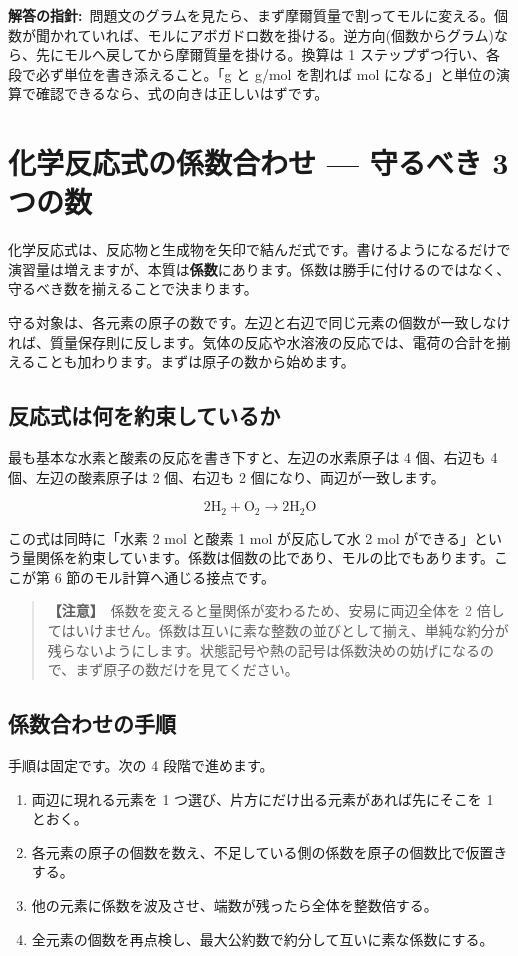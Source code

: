\documentclass{article}
\begin{document}
\textbf{解答の指針:}\ 問題文のグラムを見たら、まず摩爾質量で割ってモルに変える。個数が聞かれていれば、モルにアボガドロ数を掛ける。逆方向(個数からグラム)なら、先にモルへ戻してから摩爾質量を掛ける。換算は 1 ステップずつ行い、各段で必ず単位を書き添えること。「g と g/mol を割れば mol になる」と単位の演算で確認できるなら、式の向きは正しいはずです。

\section{化学反応式の係数合わせ — 守るべき 3 つの数}

化学反応式は、反応物と生成物を矢印で結んだ式です。書けるようになるだけで演習量は増えますが、本質は\textbf{係数}にあります。係数は勝手に付けるのではなく、守るべき数を揃えることで決まります。

守る対象は、各元素の原子の数です。左辺と右辺で同じ元素の個数が一致しなければ、質量保存則に反します。気体の反応や水溶液の反応では、電荷の合計を揃えることも加わります。まずは原子の数から始めます。

\subsection{反応式は何を約束しているか}

最も基本な水素と酸素の反応を書き下すと、左辺の水素原子は 4 個、右辺も 4 個、左辺の酸素原子は 2 個、右辺も 2 個になり、両辺が一致します。

\[ 2\mathrm{H}_{2} + \mathrm{O}_{2} \rightarrow 2\mathrm{H}_{2}\mathrm{O} \]

この式は同時に「水素 2 mol と酸素 1 mol が反応して水 2 mol ができる」という量関係を約束しています。係数は個数の比であり、モルの比でもあります。ここが第 6 節のモル計算へ通じる接点です。

\begin{quote}
\textbf{【注意】}\ 係数を変えると量関係が変わるため、安易に両辺全体を 2 倍してはいけません。係数は互いに素な整数の並びとして揃え、単純な約分が残らないようにします。状態記号や熱の記号は係数決めの妨げになるので、まず原子の数だけを見てください。
\end{quote}

\subsection{係数合わせの手順}

手順は固定です。次の 4 段階で進めます。

\begin{enumerate}
\item 両辺に現れる元素を 1 つ選び、片方にだけ出る元素があれば先にそこを 1 とおく。
\item 各元素の原子の個数を数え、不足している側の係数を原子の個数比で仮置きする。
\item 他の元素に係数を波及させ、端数が残ったら全体を整数倍する。
\item 全元素の個数を再点検し、最大公約数で約分して互いに素な係数にする。
\end{enumerate}
\end{document}
